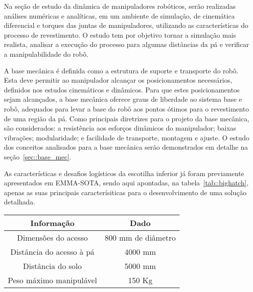 Na seção de estudo da dinâmica de manipuladores robóticos, serão realizadas
análises numéricas e analíticas, em um ambiente de simulação, de cinemática
diferencial e torques das juntas de manipuladores, utilizando as características
do processo de revestimento. O estudo tem por objetivo tornar a simulação mais
realista, analisar a execução do processo para algumas distâncias da pá
e verificar a manipulabilidade do robô.

A base mecânica é definida como a estrutura de suporte e transporte do robô.
Esta deve permitir ao manipulador alcançar os posicionamentos necessários, 
definidos nos estudos cinemáticos e dinâmicos. Para que estes
posicionamentos sejam alcançados, a base mecânica oferece graus de
liberdade ao sistema base e robô, adequados para levar a base do robô aos pontos
ótimos para o revestimento de uma região da pá. Como principais diretrizes para
o projeto da base mecânica, são considerados: a resistência aos esforços dinâmicos do
manipulador; baixas vibrações; modularidade; e facilidade de transporte,
montagem e ajuste. O estudo dos conceitos analisados para a base mecânica serão
demonstrados em detalhe na seção~\ref{sec::base_mec}.

As características e desafios logísticos da escotilha inferior já foram
previamente apresentados em EMMA-SOTA, sendo aqui apontadas, na
tabela~\ref{tab::bighatch}, apenas as suas principais caracterísiticas para o
desenvolvimento de uma solução detalhada.

\begin{center}
\begin{tabular}{  c | c  }
  \hline
  \textbf{Informação} & \textbf{Dado} \\ \hline
  Dimensões do acesso & 800 mm de diâmetro  \\ \hline
  Distância do acesso à pá & 4000 mm  \\ \hline
  Distância do solo & 5000 mm \\ \hline
  Peso máximo manipulável & 150 Kg \\
  \hline
\end{tabular}
\label{tab::bighatch}
\end{center}

 



